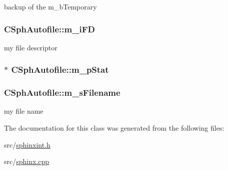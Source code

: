 backup of the m\-\_\-b\-Temporary 

\hypertarget{classCSphAutofile_aca862db8620b51f8c5a83517080c2436}{
\subsubsection[{m\-\_\-i\-F\-D}]{ C\-Sph\-Autofile\-::m\-\_\-i\-F\-D\hspace{0.3cm}{\ttfamily [protected]}}}\label{classCSphAutofile_aca862db8620b51f8c5a83517080c2436}


my file descriptor 

\hypertarget{classCSphAutofile_a8f4a21d9d657efd75b15263eaae873fe}{
\subsubsection[{m\-\_\-p\-Stat}]{$\ast$ C\-Sph\-Autofile\-::m\-\_\-p\-Stat\hspace{0.3cm}{\ttfamily [protected]}}}\label{classCSphAutofile_a8f4a21d9d657efd75b15263eaae873fe}
\hypertarget{classCSphAutofile_ace9555717055d742239289a0eef5feb8}{
\subsubsection[{m\-\_\-s\-Filename}]{ C\-Sph\-Autofile\-::m\-\_\-s\-Filename\hspace{0.3cm}{\ttfamily [protected]}}}\label{classCSphAutofile_ace9555717055d742239289a0eef5feb8}


my file name 



The documentation for this class was generated from the following files\-:\begin{DoxyCompactItemize}
\item 
src/\hyperlink{sphinxint_8h}{sphinxint.\-h}\item 
src/\hyperlink{sphinx_8cpp}{sphinx.\-cpp}\end{DoxyCompactItemize}
